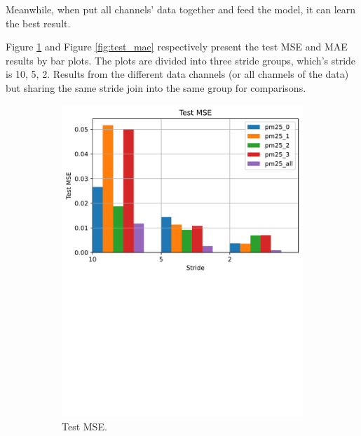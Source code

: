 Meanwhile, when put all channels' data together and feed the model, it can learn the best result.

Figure \ref{fig:test_mse} and Figure \ref{fig:test_mae} respectively present the test MSE and MAE results by bar plots. The plots are divided into three stride groups, which's stride is 10, 5, 2. Results from the different data channels (or all channels of the data) but sharing the same stride join into the same group for comparisons.

\begin{figure}[!htbp]
    \centering
    \begin{subfigure}[!htbp]{.45\textwidth}
        \centering
        \includegraphics[width=\textwidth]{fig/results/test_mse.pdf}
        \caption{Test MSE.}
        \label{fig:test_mse}
    \end{subfigure}
    \begin{subfigure}[!htbp]{.45\textwidth}
        \centering

\end{subfigure}
\end{figure}
